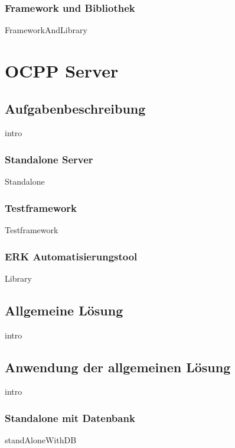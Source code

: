 \documentclass{article}
\begin{document}
        \newpage
        \subsubsection{Framework und Bibliothek}
            {FrameworkAndLibrary}
\newpage



\section{OCPP Server}
    \subsection{Aufgabenbeschreibung}
    \label{kap:taskDescription}
        {intro}
        \subsubsection{Standalone Server}
            {Standalone}
        \subsubsection{Testframework}
            {Testframework}
        \subsubsection{ERK Automatisierungstool}
            {Library}
    \newpage
    \subsection{Allgemeine Lösung}
    \label{kap:commonSolution}
        {intro}

    \newpage
    \subsection{Anwendung der allgemeinen Lösung}
        {intro}
        
        \newpage
        \subsubsection{Standalone mit Datenbank}
            {standAloneWithDB}
\end{document}
